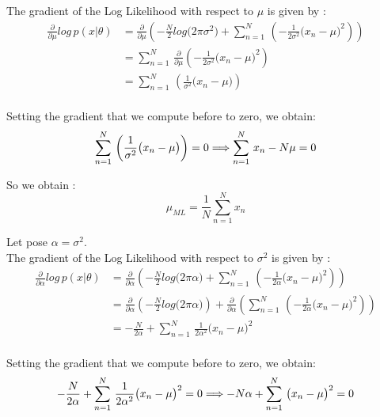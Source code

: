 \documentclass[12pt,twoside]{article}
\begin{document}
The gradient of the Log Likelihood with respect to $\mu$ is given by :
\begin{align*}
\frac{\partial}{\partial \mu}log \,p(x| \theta) &= \frac{\partial}{\partial \mu}  \left( -\frac{N}{2} log\big(2 \pi \sigma^2\big) + \sum_{n=1}^{N}  \, \left( -\frac{1}{2 \sigma^2}\big(x_n - \mu\big)^2 \right) \right) \\
&= \sum_{n=1}^{N}  \, \frac{\partial}{\partial \mu} \left(-\frac{1}{2 \sigma^2}\big(x_n - \mu\big)^2  \right)  \\
&= \sum_{n=1}^{N}  \, \left(\frac{1}{\sigma^2}\big(x_n - \mu\big) \right) \\
\end{align*}

Setting the gradient that we compute before to zero, we obtain:
\begin{equation*}
\sum_{n=1}^{N}  \, \left(\frac{1}{\sigma^2}\big(x_n - \mu\big) \right) = 0 \\
\Longrightarrow  \sum_{n=1}^{N}  \,x_n - N \mu = 0
\end{equation*}

So we obtain :
\begin{equation}
\boxed{ \mu _{ML} = \frac{1}{N} \sum_{n=1}^{N} x_n }
\end{equation}

Let pose $\alpha = \sigma^2$.\\
The gradient of the Log Likelihood with respect to $\sigma ^2$ is given by :
\begin{align*}
\frac{\partial}{\partial \alpha}log \,p(x| \theta) &= \frac{\partial}{\partial \alpha}  \left( -\frac{N}{2} log\big(2 \pi \alpha \big) + \sum_{n=1}^{N}  \, \left( -\frac{1}{2 \alpha}\big(x_n - \mu\big)^2 \right) \right) \\
&= \frac{\partial}{\partial \alpha}  \left( -\frac{N}{2} log\big(2 \pi \alpha \big)\right) + \frac{\partial}{\partial \alpha}  \left( \sum_{n=1}^{N}  \, \left( -\frac{1}{2 \alpha}\big(x_n - \mu\big)^2 \right) \right) \\
&= -\frac{N}{2 \alpha} + \sum_{n=1}^{N}  \,  \frac{1}{2 \alpha^2}\big(x_n - \mu\big)^2  \\
\end{align*}

Setting the gradient that we compute before to zero, we obtain:
\begin{equation*}
-\frac{N}{2 \alpha} + \sum_{n=1}^{N}  \,  \frac{1}{2 \alpha^2}\big(x_n - \mu\big)^2  = 0 \\
\Longrightarrow  -N \alpha + \sum_{n=1}^{N}  \,  \big(x_n - \mu\big)^2  = 0
\end{equation*}
\end{document}
